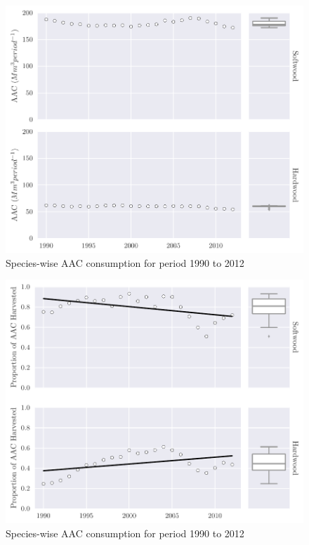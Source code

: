 \begin{figure}[h]
  \centering
  \includegraphics[width=\textwidth]{images/aac}
  \caption{Species-wise AAC consumption for period 1990 to 2012}
  \label{fig:aac}
\end{figure}

\begin{figure}[h]
  \centering
  \includegraphics[width=\textwidth]{images/aac_consumption}
  \caption{Species-wise AAC consumption for period 1990 to 2012}
  \label{fig:aac_consumption}
\end{figure}

